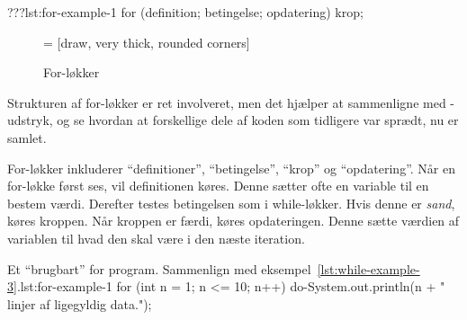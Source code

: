 		\begin{JavaCode}{???}{lst:for-example-1}
			for (definition; betingelse; opdatering) {
				krop;
			}
		\end{JavaCode}

        \begin{figure}
        \center
         = [draw, very thick, rounded corners]
        \caption{For-løkker}
        \label{fig:for-loop-illustrated}
        \end{figure}

		Strukturen af for-løkker er ret involveret, men det hjælper at
		sammenligne med -udstryk, og se hvordan at forskellige
		dele af koden som tidligere var sprædt, nu er samlet.

        For-løkker inkluderer ``definitioner'', ``betingelse'',
        ``krop'' og ``opdatering''. Når en for-løkke først ses, vil
        definitionen køres. Denne sætter ofte en variable til en
        bestem værdi. Derefter testes betingelsen som i while-løkker.
        Hvis denne er \emph{sand}, køres kroppen. Når kroppen er
        færdi, køres opdateringen. Denne sætte værdien af variablen
        til hvad den skal være i den næste iteration.

		\begin{JavaCode}{Et ``brugbart'' for program. Sammenlign med eksempel~\ref{lst:while-example-3}.}{lst:for-example-1}
			for (int n = 1; n <= 10; n++) {
				do-System.out.println(n + " linjer af ligegyldig data.");
			}
		\end{JavaCode}

